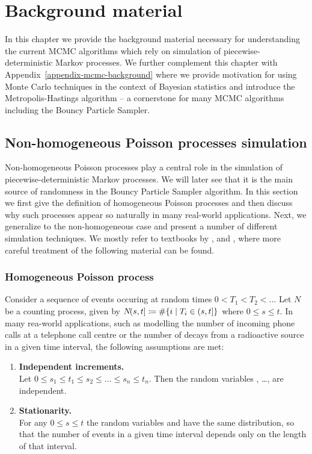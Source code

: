 \documentclass[report.tex]{subfiles}
\begin{document}
\chapter{Background material}

In this chapter we provide the background material necessary for understanding the
current MCMC algorithms which rely on simulation of
piecewise-deterministic Markov processes.
We further complement this chapter with Appendix~\ref{appendix-mcmc-background}
where we provide motivation for using Monte Carlo techniques in the context of
Bayesian statistics and
introduce the Metropolis-Hastings algorithm
-- a cornerstone for many MCMC algorithms including the Bouncy Particle Sampler.


\section{Non-homogeneous Poisson processes simulation}
\label{background-material-poisson-processes}


Non-homogeneous Poisson processes play a central role in the simulation of
piecewise-deterministic Markov processes. We will later see that it is
the main source of randomness in the Bouncy Particle Sampler algorithm.
In this section we first give the definition of homogeneous Poisson processes
and then discuss why such processes appear so naturally in many real-world applications.
Next, we generalize to the non-homogeneous case and present a number of different
simulation techniques.
We mostly refer to textbooks by
\citet{devroye2013non},
\citet{feller1968Introduction} and
\citet{ross1996stochastic},
where more careful treatment of the following material can be found.

\subsection{Homogeneous Poisson process}

Consider a sequence of events occuring at random times
$0 < T_{1} < T_{2} < \dots$ Let $N$ be a counting process, given by
${N}\!({s},{t}] \coloneqq \# \{ i \mid T_{i} \in (s, t] \}$ where
$0 \leq s \leq t$.
In many rea-world applications, such as modelling the number of incoming
phone calls at a telephone call centre or the number of decays from a
radioactive source in a given time interval, the following assumptions are met:

\begin{enumerate}
  \item \textbf{Independent increments.} \\
  Let $0 \leq s_{1} \leq t_{1} \leq s_{2} \leq \dots \leq s_{n} \leq t_{n}$.
  Then the random variables
  , \dots, 
  are independent.

  \item \textbf{Stationarity.} \\
  For any $0 \leq s \leq t$ the random variables
   and 
  have the same distribution, so that the number of events in a given time
  interval depends only on the length of that interval.
\end{enumerate}
\end{document}
